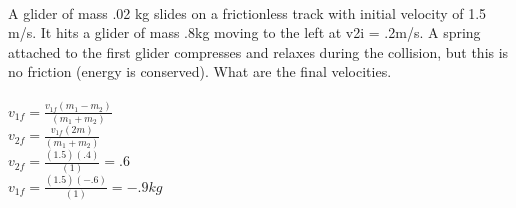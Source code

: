\documentclass{article}
\begin{document}
\hrulefill
\subsubsection{}
\hrulefill \\[15pt]

A glider of mass .02 kg slides on a frictionless track with initial velocity of 1.5 m/s. It hits a glider of mass .8kg moving to the left at v2i = .2m/s. A spring attached to the first glider compresses and relaxes during the collision, but this is no friction (energy is conserved). What are the final velocities. \\ [15pt]

 \\ [10pt]

$v_{1f} = \frac{v_{1f}(m_1-m_2)} {(m_1 + m_2)}$ \\ [15pt]

$v_{2f} = \frac{v_{1f}(2m)} {(m_1 + m_2)}$ \\ [15pt]

$v_{2f} = \frac{(1.5)(.4)} {(1)} = .6$\\ [15pt]

$v_{1f} = \frac{(1.5)(-.6)} {(1)} = -.9kg$\\ [15pt]
\end{document}
